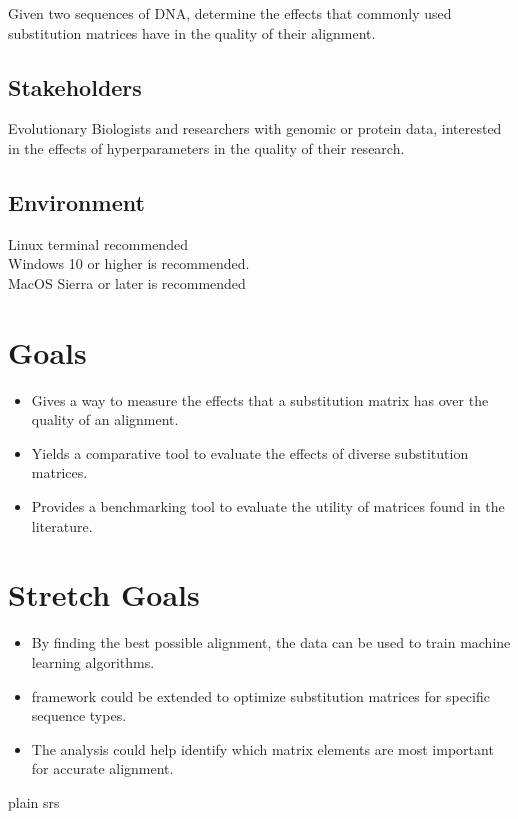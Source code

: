 \documentclass{article}
\begin{document}
Given two sequences of DNA, determine the effects that commonly used substitution matrices have in the quality of their alignment.

\subsection{Stakeholders}

Evolutionary Biologists and researchers with genomic or protein data,
interested in the effects of hyperparameters in the quality of their research.
\subsection{Environment}

Linux terminal recommended\\
Windows 10 or higher is recommended.\\
MacOS Sierra or later is recommended

\section{Goals}

\begin{itemize}
    \item Gives a way to measure the effects that a substitution matrix has over the quality of an alignment.
    \item Yields a comparative tool to evaluate the effects of diverse substitution matrices.
    \item Provides a benchmarking tool to evaluate the utility of matrices found in the literature.
\end{itemize}

\section{Stretch Goals}

\begin{itemize}
    \item By finding the best possible alignment, the data can be used to train machine learning algorithms.
    \item framework could be extended to optimize substitution matrices for specific sequence types.
    \item The analysis could help identify which matrix elements are most important for accurate alignment.
\end{itemize}

\newpage

 {plain}
 {srs}

\end{document}

